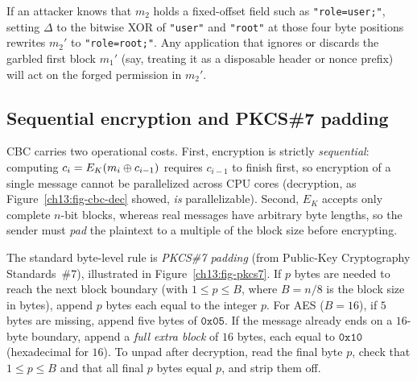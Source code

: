 If an attacker knows that $m_2$ holds a fixed-offset field such as \texttt{"role=user;"}, setting $\Delta$ to the bitwise XOR of \texttt{"user"} and \texttt{"root"} at those four byte positions rewrites $m_2'$ to \texttt{"role=root;"}. Any application that ignores or discards the garbled first block $m_1'$ (say, treating it as a disposable header or nonce prefix) will act on the forged permission in $m_2'$.

\subsection{Sequential encryption and PKCS\#7 padding}

CBC carries two operational costs. First, encryption is strictly \emph{sequential}: computing $c_i = E_K(m_i \oplus c_{i-1})$ requires $c_{i-1}$ to finish first, so encryption of a single message cannot be parallelized across CPU cores (decryption, as Figure~\ref{ch13:fig-cbc-dec} showed, \emph{is} parallelizable). Second, $E_K$ accepts only complete $n$-bit blocks, whereas real messages have arbitrary byte lengths, so the sender must \emph{pad} the plaintext to a multiple of the block size before encrypting.

The standard byte-level rule is \emph{PKCS\#7 padding} (from Public-Key Cryptography Standards~\#7), illustrated in Figure~\ref{ch13:fig-pkcs7}. If $p$ bytes are needed to reach the next block boundary (with $1 \le p \le B$, where $B = n/8$ is the block size in bytes), append $p$ bytes each equal to the integer $p$. For AES ($B = 16$), if $5$ bytes are missing, append five bytes of $\mathtt{0x05}$. If the message already ends on a $16$-byte boundary, append a \emph{full extra block} of $16$ bytes, each equal to $\mathtt{0x10}$ (hexadecimal for $16$). To unpad after decryption, read the final byte $p$, check that $1 \le p \le B$ and that all final $p$ bytes equal $p$, and strip them off.

